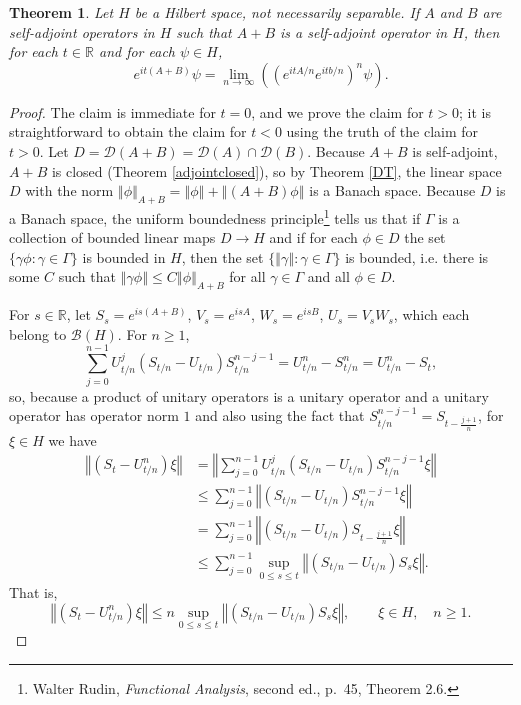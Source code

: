 \documentclass{article}
\newcommand{\norm}[1]{\left\Vert #1 \right\Vert}
\newtheorem{theorem}{Theorem}
\theoremstyle{definition}
\begin{document}
\begin{theorem}
Let $H$ be a  Hilbert space, not necessarily separable. If $A$ and $B$ are self-adjoint operators in $H$ such that $A+B$ is a self-adjoint 
operator in $H$, then for each $t \in \mathbb{R}$ and for each $\psi \in H$,
\[
e^{it(A+B)}\psi = \lim_{n \to \infty} \left((e^{itA/n} e^{itb/n})^n \psi \right).
\]
\end{theorem}
\begin{proof}
The claim is immediate for $t=0$, and we prove the claim for $t > 0$; it is straightforward to obtain the claim for $t<0$ using the truth of the claim
for $t>0$.
Let $D = \mathscr{D}(A+B) = \mathscr{D}(A) \cap \mathscr{D}(B)$. Because $A+B$ is self-adjoint, $A+B$ is closed (Theorem \ref{adjointclosed}), so
by Theorem \ref{DT}, the linear space $D$ with the norm $\norm{\phi}_{A+B} = \norm{\phi}+\norm{(A+B)\phi}$ is a Banach space. 
Because $D$ is a Banach space, the uniform boundedness principle\footnote{Walter Rudin, {\em Functional Analysis}, second ed., p.~45, Theorem 2.6.}
tells us that if $\Gamma$ is a collection of bounded linear maps $D \to H$ and if for each $\phi \in D$ the set
$\{\gamma \phi: \gamma \in \Gamma\}$ is bounded in $H$, then the set $\{\norm{\gamma}:\gamma \in \Gamma\}$ is bounded, i.e.
there is some $C$ such that $\norm{\gamma \phi} \leq C\norm{\phi}_{A+B}$ for all $\gamma \in \Gamma$ and all $\phi \in D$.

For $s \in \mathbb{R}$,
let $S_s = e^{is(A+B)}$, $V_s=e^{isA}$, $W_s=e^{isB}$, $U_s=V_sW_s$, which each belong to
$\mathscr{B}(H)$.
For $n \geq 1$, 
\[
\sum_{j=0}^{n-1} U_{t/n}^j(S_{t/n}-U_{t/n})S_{t/n}^{n-j-1}
=U_{t/n}^n-S_{t/n}^n=U_{t/n}^n-S_t,
\]
so, because a product of unitary operators is a unitary operator and a unitary operator has operator norm $1$ and
also using the fact that $S_{t/n}^{n-j-1}=S_{t-\frac{j+1}{n}}$, for $\xi \in H$ we have
\begin{align*}
\norm{(S_t-U_{t/n}^n)\xi}&=\norm{\sum_{j=0}^{n-1} U_{t/n}^j(S_{t/n}-U_{t/n})S_{t/n}^{n-j-1}\xi}\\
&\leq \sum_{j=0}^{n-1} \norm{(S_{t/n}-U_{t/n})S_{t/n}^{n-j-1}\xi}\\
&=\sum_{j=0}^{n-1} \norm{(S_{t/n}-U_{t/n}) S_{t-\frac{j+1}{n}} \xi}\\
&\leq \sum_{j=0}^{n-1} \sup_{0 \leq s \leq t} \norm{(S_{t/n}-U_{t/n})S_s \xi}.
\end{align*}
That is, 
\begin{equation}
\norm{(S_t-U_{t/n}^n)\xi} \leq n\sup_{0 \leq s \leq t} \norm{(S_{t/n}-U_{t/n})S_s \xi},
\qquad \xi \in H, \quad n \geq 1.
\label{tsup}
\end{equation}


\end{proof}
\end{document}
